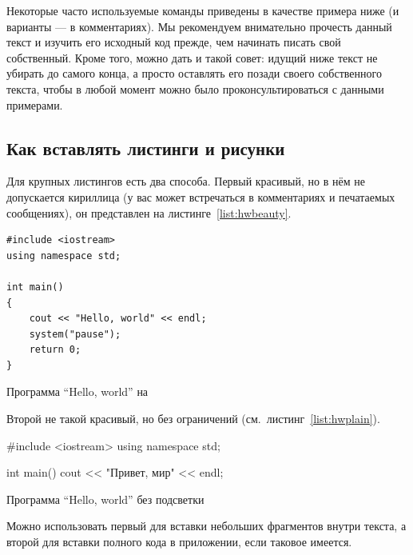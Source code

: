 Некоторые часто используемые
команды приведены в качестве примера ниже (и варианты — в
комментариях). Мы рекомендуем внимательно прочесть данный
текст и изучить его исходный код прежде, чем начинать писать
свой собственный. Кроме того, можно дать и такой совет: идущий
ниже текст не убирать до самого конца, а просто оставлять его
позади своего собственного текста, чтобы в любой момент можно
было проконсультироваться с данными примерами.

\subsection{Как вставлять листинги и рисунки}

Для крупных листингов есть два способа. Первый красивый, но в нём не допускается
кириллица (у вас может встречаться в комментариях и
печатаемых сообщениях), он представлен на листинге~\ref{list:hwbeauty}.
\begin{ListingEnv}[H]%
\begin{lstlisting}
#include <iostream>
using namespace std;

int main()
{
    cout << "Hello, world" << endl;
    system("pause");
    return 0;
}
\end{lstlisting}
\caption{Программа “Hello, world” на \protect\cpp}
\label{list:hwbeauty}
\end{ListingEnv}

Второй не такой красивый, но без ограничений (см.~листинг~\ref{list:hwplain}).
\begin{ListingEnv}[H]
\begin{Verb}

#include <iostream>
using namespace std;

int main()
{
    cout << "Привет, мир" << endl;
}
\end{Verb}
\caption{Программа “Hello, world” без подсветки}
\label{list:hwplain}
\end{ListingEnv}

Можно использовать первый для вставки небольших фрагментов
внутри текста, а второй для вставки полного
кода в приложении, если таковое имеется.

